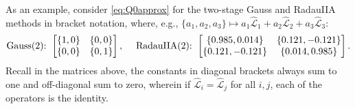 \documentclass[review]{siamart}
\begin{document}
As an example, consider \eqref{eq:Q0approx} for the two-stage Gauss and
RadauIIA methods in bracket notation, where, e.g., $\{a_1,a_2,a_3\}\mapsto 
a_1\widehat{\mathcal{L}}_1 + a_2\widehat{\mathcal{L}}_2 + a_3\widehat{\mathcal{L}}_3$:
%
\begin{align*}
\textnormal{Gauss(2):} \hspace{1ex}
	\begin{bmatrix}
	\{1,0\} & \{0,0\} \\
	 \{0,0\} & \{0,1\} \\
	\end{bmatrix},
	\hspace{3ex}
\textnormal{RadauIIA(2):} \hspace{1ex}
	\begin{bmatrix}
	\{0.985,0.014\} & \{0.121,-0.121\}\\
	\{0.121,-0.121\} & \{0.014,0.985\}\\
	\end{bmatrix}.
\end{align*}
%
Recall in the matrices above, the constants in diagonal brackets always sum to
one and off-diagonal sum to zero, wherein if $\widehat{\mathcal{L}}_i = \widehat{\mathcal{L}}_j$
for all $i,j$, each of the operators is the identity.
\end{document}
